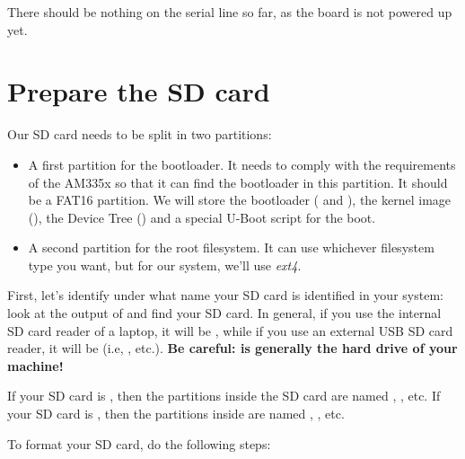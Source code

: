 There should be nothing on the serial line so far, as the board is not
powered up yet.

\section{Prepare the SD card}

Our SD card needs to be split in two partitions:

\begin{itemize}

\item A first partition for the bootloader. It needs to comply with
  the requirements of the AM335x so that it can find the bootloader in
  this partition. It should be a FAT16 partition. We will store the
  bootloader ( and ), the kernel image
  (), the Device Tree () and a
  special U-Boot script for the boot.

\item A second partition for the root filesystem. It can use
  whichever filesystem type you want, but for our system, we'll use
  {\em ext4}.

\end{itemize}

First, let's identify under what name your SD card is identified in
your system: look at the output of  and
find your SD card. In general, if you use the internal SD card reader
of a laptop, it will be , while if you use an external
USB SD card reader, it will be  (i.e, ,
etc.). {\bf Be careful:  is generally the hard drive of
  your machine!}

If your SD card is , then the partitions inside the
SD card are named , , etc. If your SD
card is , then the partitions inside are named
, , etc.

To format your SD card, do the following steps:

